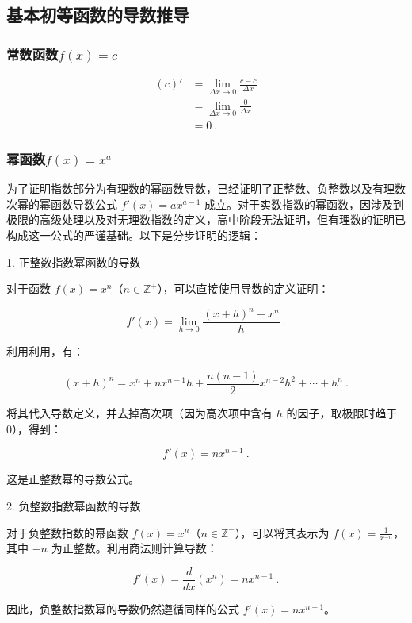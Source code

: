\subsection{基本初等函数的导数推导}

\subsubsection{常数函数$f(x)=c$}

\begin{equation}
\begin{split}
(c)'&=\lim_{\Delta x\to 0}\frac{c-c}{\Delta x}\\
&=\lim_{\Delta x\to 0}\frac{0}{\Delta x}\\
&=0~.
\end{split}
\end{equation}

\subsubsection{幂函数$f(x)=x^a$}

为了证明指数部分为有理数的幂函数导数，已经证明了正整数、负整数以及有理数次幂的幂函数导数公式 $f'(x) = ax^{a-1}$ 成立。对于实数指数的幂函数，因涉及到极限的高级处理以及对无理数指数的定义，高中阶段无法证明，但有理数的证明已构成这一公式的严谨基础。以下是分步证明的逻辑：

1. 正整数指数幂函数的导数

对于函数 $f(x) = x^n$（$n \in \mathbb{Z}^+$），可以直接使用导数的定义证明：

$$
f'(x) = \lim_{h \to 0} \frac{(x+h)^n - x^n}{h}~.
$$

利用利用，有：

$$
(x+h)^n = x^n + nx^{n-1}h + \frac{n(n-1)}{2}x^{n-2}h^2 + \cdots + h^n~.
$$

将其代入导数定义，并去掉高次项（因为高次项中含有 $h$ 的因子，取极限时趋于 0），得到：

$$
f'(x) = nx^{n-1}~.
$$

这是正整数幂的导数公式。

2. 负整数指数幂函数的导数

对于负整数指数的幂函数 $f(x) = x^n$（$n \in \mathbb{Z}^-$），可以将其表示为 $f(x) = \frac{1}{x^{-n}}$，其中 $-n$ 为正整数。利用商法则计算导数：

$$
f'(x) = \frac{d}{dx}\left(x^n\right) = nx^{n-1}~.
$$

因此，负整数指数幂的导数仍然遵循同样的公式 $f'(x) = nx^{n-1}$。

